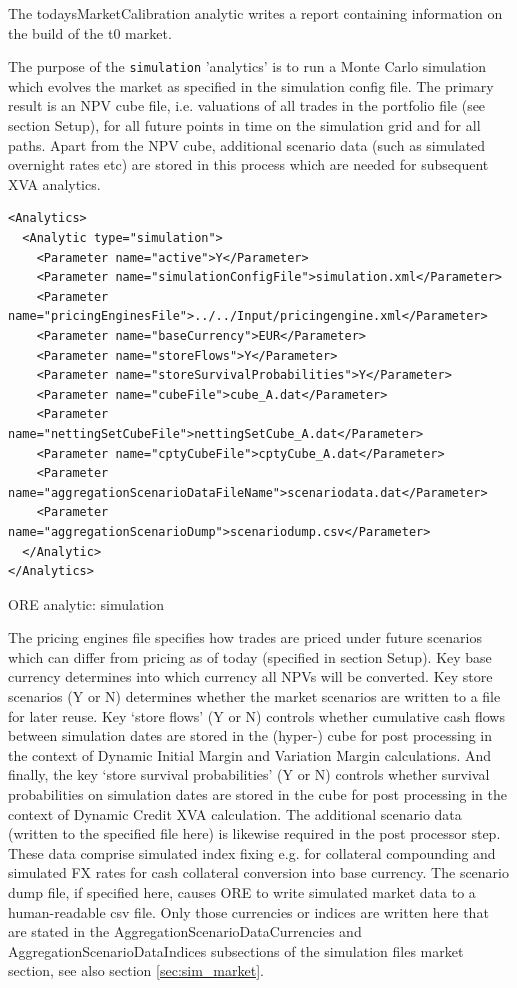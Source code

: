 \documentclass[12pt, a4paper]{article}
\begin{document}
{The todaysMarketCalibration analytic writes a report containing information on the build of the t0 market.

\medskip The purpose of the {\tt simulation} 'analytics' is to run a Monte Carlo simulation which evolves the market as
specified in the simulation config file. The primary result is an NPV cube file, i.e. valuations of all trades in the
portfolio file (see section Setup), for all future points in time on the simulation grid and for all paths. Apart from
the NPV cube, additional scenario data (such as simulated overnight rates etc) are stored in this process which are
needed for subsequent XVA analytics.

\begin{listing}[H]
\begin{verbatim}
<Analytics>
  <Analytic type="simulation">
    <Parameter name="active">Y</Parameter>
    <Parameter name="simulationConfigFile">simulation.xml</Parameter>
    <Parameter name="pricingEnginesFile">../../Input/pricingengine.xml</Parameter>
    <Parameter name="baseCurrency">EUR</Parameter>
    <Parameter name="storeFlows">Y</Parameter>
    <Parameter name="storeSurvivalProbabilities">Y</Parameter>
    <Parameter name="cubeFile">cube_A.dat</Parameter>
    <Parameter name="nettingSetCubeFile">nettingSetCube_A.dat</Parameter>
    <Parameter name="cptyCubeFile">cptyCube_A.dat</Parameter>
    <Parameter name="aggregationScenarioDataFileName">scenariodata.dat</Parameter>
    <Parameter name="aggregationScenarioDump">scenariodump.csv</Parameter>
  </Analytic>
</Analytics>      
\end{verbatim}
\caption{ORE analytic: simulation}
\label{lst:ore_simulation}
\end{listing}

The pricing engines file specifies how trades are priced under future scenarios which can differ from pricing as of
today (specified in section Setup).  Key base currency determines into which currency all NPVs will be converted. Key
store scenarios (Y or N) determines whether the market scenarios are written to a file for later reuse. Key
`store flows' (Y or N) controls whether cumulative cash flows between simulation dates are stored in the (hyper-)
cube for post processing in the context of Dynamic Initial Margin and Variation Margin calculations. And finally, the
key `store survival probabilities' (Y or N) controls whether survival probabilities on simulation dates are stored in the
cube for post processing in the context of Dynamic Credit XVA calculation. The additional
scenario data (written to the specified file here) is likewise required in the post processor step. These data comprise
simulated index fixing e.g. for collateral compounding and simulated FX rates for cash collateral conversion into base
currency. The scenario dump file, if specified here, causes ORE to write simulated market data to a human-readable csv
file. Only those currencies or indices are written here that are stated in the AggregationScenarioDataCurrencies and 
AggregationScenarioDataIndices subsections of the simulation files market section, see also section
\ref{sec:sim_market}.
 
}
\end{document}
